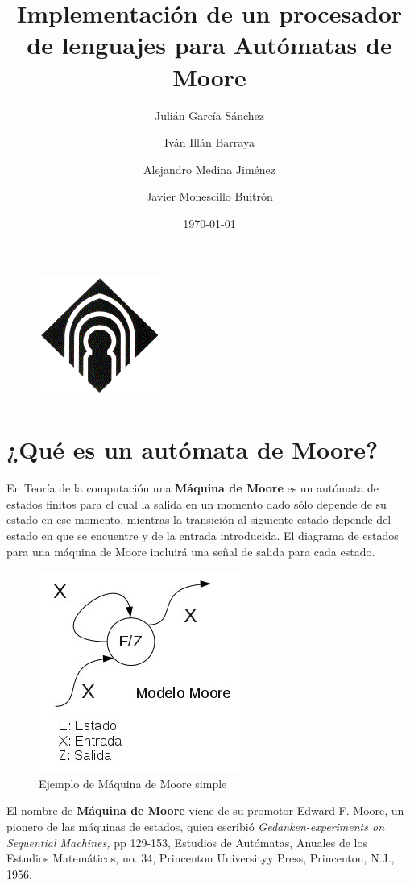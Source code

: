 \documentclass[12pt,a4paper]{article}
\author{Julián García Sánchez \and Iván Illán Barraya \and Alejandro Medina Jiménez \and Javier Monescillo Buitrón}
\title{Implementación de un procesador de lenguajes para Autómatas de Moore}
\date{\today}
\begin{document}
	
	\maketitle
	
	\begin{figure}[h]
		\centering
		\includegraphics[width=0.25
		\linewidth]{img/image004}
		\caption{}
		\label{fig:image004}
	\end{figure}

	\newpage
	\tableofcontents
	\newpage
	
	\section{¿Qué es un autómata de Moore?}
	En Teoría de la computación una \textbf{Máquina de Moore} es un autómata de estados finitos para el cual la salida en un momento dado sólo depende de su estado en ese momento, mientras la transición al siguiente estado depende del estado en que se encuentre y de la entrada introducida.
	El diagrama de estados para una máquina de Moore incluirá una señal de salida para cada estado. \cite{Moore1}
	
	\begin{figure}[h]
		\centering
		\includegraphics[width=0.5
		\linewidth]{img/Modelo-moore}
		\caption{Ejemplo de Máquina de Moore simple}
		\label{fig:modelo-moore}
	\end{figure}
	
	
	
	El nombre de \textbf{Máquina de Moore} viene de su promotor Edward F. Moore, un pionero de las máquinas de estados, quien escribió \textit{Gedanken-experiments on Sequential Machines,} pp 129-153, Estudios de Autómatas, Anuales de los Estudios Matemáticos, no. 34, Princenton Universityy Press, Princenton, N.J., 1956. \cite{Moore1}
	
\end{document}
